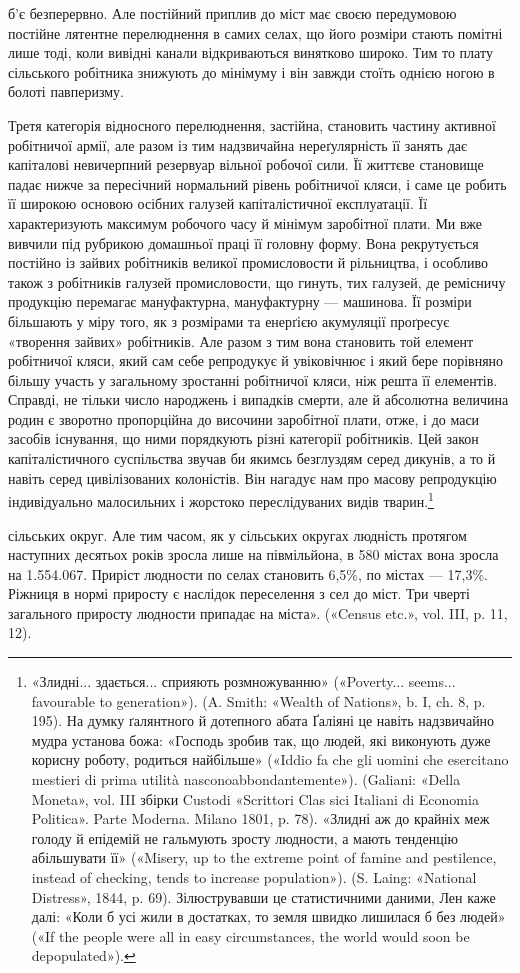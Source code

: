 б’є безперервно. Але постійний приплив до міст має своєю передумовою постійне лятентне перелюднення
в самих селах, що його розміри стають помітні лише тоді, коли вивідні канали відкриваються винятково
широко. Тим то плату сільського робітника
знижують до мінімуму і він завжди стоїть однією ногою в болоті павперизму.

Третя категорія відносного перелюднення, застійна, становить частину активної робітничої армії, але
разом із тим надзвичайна нереґулярність її занять дає капіталові невичерпний резервуар вільної
робочої сили. Її життєве становище падає нижче за
пересічний нормальний рівень робітничої кляси, і саме це робить її широкою основою осібних галузей
капіталістичної експлуатації. Її характеризують максимум робочого часу й мінімум заробітної плати.
Ми вже вивчили під рубрикою домашньої праці її головну форму. Вона рекрутується постійно із зайвих
робітників великої промисловости й рільництва, і особливо також з робітників галузей промисловости,
що гинуть, тих галузей, де ремісничу продукцію перемагає мануфактурна, мануфактурну — машинова. Її
розміри більшають у міру того, як з розмірами та енерґією акумуляції проґресує «творення зайвих»
робітників. Але разом з тим вона становить той елемент робітничої кляси, який сам себе репродукує й
увіковічнює і який бере порівняно більшу участь у загальному зростанні робітничої кляси, ніж решта
її елементів. Справді, не тільки число народжень і випадків смерти, але й абсолютна величина родин є
зворотно пропорційна до височини заробітної плати, отже, і до маси засобів існування, що ними
порядкують різні категорії робітників. Цей закон капіталістичного суспільства звучав би якимсь
безглуздям серед дикунів, а то й навіть серед цивілізованих колоністів. Він нагадує нам про масову
репродукцію індивідуально малосильних і жорстоко переслідуваних видів тварин.\footnote{
«Злидні... здається... сприяють розмножуванню» («Poverty... seems... favourable to generation»).
(A. Smith: «Wealth of Nations», b. I, ch. 8, p. 195). На думку ґалянтного й дотепного абата Ґаліяні
це навіть надзвичайно мудра установа божа: «Господь зробив так, що людей, які виконують дуже корисну
роботу, родиться найбільше» («Iddio fa che
gli uomini che esercitano mestieri di prima utilità nasconoabbondantemente»). (Galiani: «Della
Moneta», vol. III збірки Custodi «Scrittori Clas sici Italiani di Economia Politica». Parte Moderna.
Milano 1801, p. 78). «Злидні аж до крайніх меж голоду й епідемій не гальмують зросту людности, а
мають тенденцію абільшувати її» («Misery, up to the extreme point of famine and pestilence, instead
of checking, tends to increase population»).
(S. Laing: «National Distress», 1844, p. 69). Зілюструвавши це статистичними даними, Лен каже далі:
«Коли б усі жили в достатках, то земля швидко лишилася б без людей» («If the people were all in easy
circumstances, the world would soon be depopulated»).
}

сільських округ. Але тим часом, як у сільських округах людність протягом наступних десятьох років
зросла лише на півмільйона, в 580 містах вона зросла на 1.554.067. Приріст людности по селах
становить 6,5\%, по містах — 17,3\%. Ріжниця в нормі приросту є наслідок переселення з сел до міст.
Три чверті загального приросту людности припадає на міста». («Census etc.», vol. III, p. 11, 12).